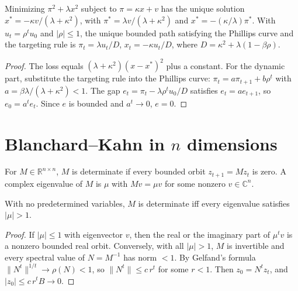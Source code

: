 \begin{theorem}
\label{thm:nk_discretion}
\leanok
Minimizing $\pi^2 + \lambda x^2$ subject to $\pi = \kappa x + v$ has the unique solution
$x^* = -\kappa v/(\lambda+\kappa^2)$, with $\pi^* = \lambda v/(\lambda+\kappa^2)$ and $x^* = -(\kappa/\lambda)\pi^*$.
With $u_t = \rho^tu_0$ and $|\rho| \le 1$, the unique bounded path satisfying the Phillips curve and the targeting
rule is $\pi_t = \lambda u_t/D$, $x_t = -\kappa u_t/D$, where $D = \kappa^2 + \lambda(1-\beta\rho)$.
\end{theorem}
\begin{proof}
\leanok
The loss equals $(\lambda+\kappa^2)(x - x^*)^2$ plus a constant. For the dynamic part, substitute the targeting
rule into the Phillips curve: $\pi_t = a\pi_{t+1} + b\rho^t$ with $a = \beta\lambda/(\lambda+\kappa^2) < 1$. The
gap $e_t = \pi_t - \lambda\rho^tu_0/D$ satisfies $e_t = ae_{t+1}$, so $e_0 = a^te_t$. Since $e$ is bounded and
$a^t \to 0$, $e = 0$.
\end{proof}

\section{Blanchard--Kahn in $n$ dimensions}

\begin{definition}[Determinacy]
\label{def:bkn}
\leanok
For $M \in \mathbb{R}^{n\times n}$, $M$ is determinate if every bounded orbit $z_{t+1} = Mz_t$ is zero. A complex
eigenvalue of $M$ is $\mu$ with $Mv = \mu v$ for some nonzero $v \in \mathbb{C}^n$.
\end{definition}

\begin{theorem}
\label{thm:bkn}
\leanok
{}
With no predetermined variables, $M$ is determinate iff every eigenvalue satisfies $|\mu| > 1$.
\end{theorem}
\begin{proof}
\leanok
If $|\mu| \le 1$ with eigenvector $v$, then the real or the imaginary part of $\mu^tv$ is a nonzero bounded
real orbit. Conversely, with all $|\mu| > 1$, $M$ is invertible and every spectral value of $N = M^{-1}$ has
norm $< 1$. By Gelfand's formula $\|N^t\|^{1/t} \to \rho(N) < 1$, so $\|N^t\| \le c\,r^t$ for some $r<1$. Then
$z_0 = N^tz_t$, and $|z_0| \le c\,r^tB \to 0$.
\end{proof}

